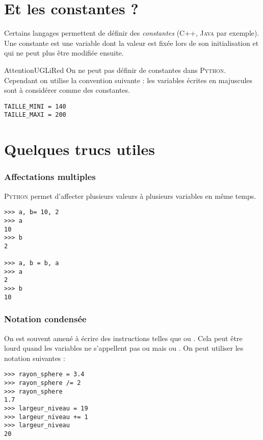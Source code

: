 \section{Et les constantes ?}


Certains langages permettent de définir des \textit{constantes} (\textsc{C++}, \textsc{Java} par exemple). Une constante est \og une variable dont la valeur est fixée lors de son initialisation et qui ne peut plus être modifiée ensuite.

\begin{encadrecolore}{Attention}{UGLiRed}
    On ne peut pas définir de constantes dans \textsc{Python}.\\
    Cependant on utilise la convention suivante : les variables écrites en majuscules sont à considérer comme des constantes.
\end{encadrecolore}

\begin{pyc}\begin{verbatim}
TAILLE_MINI = 140
TAILLE_MAXI = 200
\end{verbatim}
\end{pyc}


\section{Quelques \og trucs \fg{} utiles}

\subsubsection*{Affectations multiples}
\textsc{Python} permet d'affecter plusieurs valeurs à plusieurs variables en même temps.

\begin{pys}\begin{verbatim}
>>> a, b= 10, 2
>>> a
10
>>> b
2

>>> a, b = b, a
>>> a
2
>>> b
10
\end{verbatim}
\end{pys}

\subsubsection*{Notation condensée}
On est souvent amené à écrire des instructions telles que   ou . Cela peut être lourd quand les variables ne s'appellent
pas  ou  mais  ou . On peut utiliser les notation suivantes :
\begin{pys}\begin{verbatim}
>>> rayon_sphere = 3.4
>>> rayon_sphere /= 2
>>> rayon_sphere
1.7
>>> largeur_niveau = 19
>>> largeur_niveau += 1
>>> largeur_niveau
20
\end{verbatim}
\end{pys}

